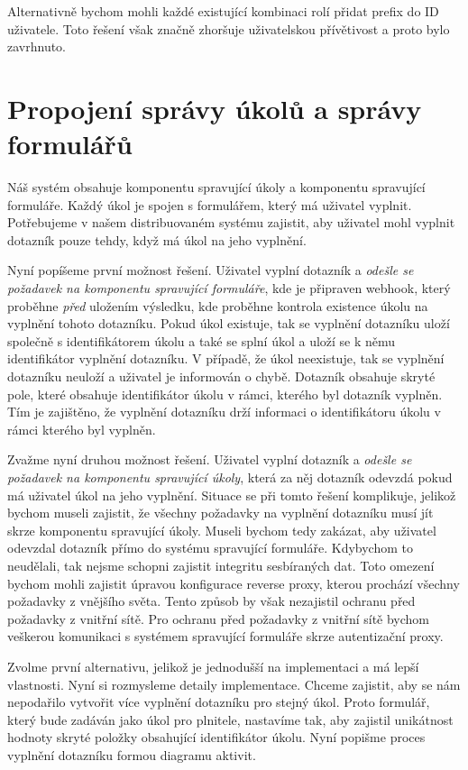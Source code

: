 Alternativně bychom mohli každé existující kombinaci rolí přidat prefix do ID uživatele.
Toto řešení však značně zhoršuje uživatelskou přívětivost a proto bylo zavrhnuto.

\section{Propojení správy úkolů a správy formulářů}\label{sec:propojeni-spravy-ukolu-a-spravy-formularu}

Náš systém obsahuje komponentu spravující úkoly a komponentu spravující formuláře.
Každý úkol je spojen s formulářem, který má uživatel vyplnit.
Potřebujeme v našem distribuovaném systému zajistit, aby uživatel mohl vyplnit dotazník pouze tehdy, když má úkol na jeho vyplnění.

Nyní popíšeme první možnost řešení.
Uživatel vyplní dotazník a \emph{odešle se požadavek na komponentu spravující formuláře}, kde je připraven webhook, který proběhne \emph{před} uložením výsledku, kde proběhne kontrola existence úkolu na vyplnění tohoto dotazníku.
Pokud úkol existuje, tak se vyplnění dotazníku uloží společně s identifikátorem úkolu a také se splní úkol a uloží se k němu identifikátor vyplnění dotazníku.
V případě, že úkol neexistuje, tak se vyplnění dotazníku neuloží a uživatel je informován o chybě.
Dotazník obsahuje skryté pole, které obsahuje identifikátor úkolu v rámci, kterého byl dotazník vyplněn.
Tím je zajištěno, že vyplnění dotazníku drží informaci o identifikátoru úkolu v rámci kterého byl vyplněn.

Zvažme nyní druhou možnost řešení.
Uživatel vyplní dotazník a \emph{odešle se požadavek na komponentu spravující úkoly}, která za něj dotazník odevzdá pokud má uživatel úkol na jeho vyplnění.
Situace se při tomto řešení komplikuje, jelikož bychom museli zajistit, že všechny požadavky na vyplnění dotazníku musí jít skrze komponentu spravující úkoly.
Museli bychom tedy zakázat, aby uživatel odevzdal dotazník přímo do systému spravující formuláře.
Kdybychom to neudělali, tak nejsme schopni zajistit integritu sesbíraných dat.
Toto omezení bychom mohli zajistit úpravou konfigurace reverse proxy, kterou prochází všechny požadavky z vnějšího světa.
Tento způsob by však nezajistil ochranu před požadavky z vnitřní sítě.
Pro ochranu před požadavky z vnitřní sítě bychom veškerou komunikaci s systémem spravující formuláře skrze autentizační proxy.

Zvolme první alternativu, jelikož je jednodušší na implementaci a má lepší vlastnosti.
Nyní si rozmysleme detaily implementace.
Chceme zajistit, aby se nám nepodařilo vytvořit více vyplnění dotazníku pro stejný úkol.
Proto formulář, který bude zadáván jako úkol pro plnitele, nastavíme tak, aby zajistil unikátnost hodnoty skryté položky obsahující identifikátor úkolu.
Nyní popišme proces vyplnění dotazníku formou diagramu aktivit.

